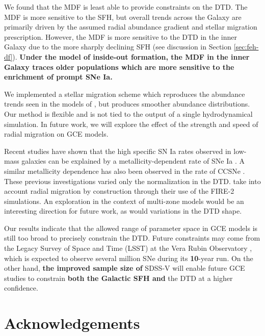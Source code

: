 \documentclass[twocolumn,twocolappendix,linenumbers]{aastex631}
\begin{document}
We found that the MDF is least able to provide constraints on the DTD. The MDF is more sensitive to the SFH, but overall trends across the Galaxy are primarily driven by the assumed radial abundance gradient and stellar migration prescription. However, the MDF is more sensitive to the DTD in the inner Galaxy due to the more sharply declining SFH (see discussion in Section \ref{sec:feh-df}). %
{\bf Under the model of inside-out formation, the MDF in the inner Galaxy traces older populations which are more sensitive to the enrichment of prompt SNe Ia.}

We implemented a stellar migration scheme which reproduces the abundance trends seen in the models of , but produces smoother abundance distributions. Our method is flexible and is not tied to the output of a single hydrodynamical simulation. In future work, we will explore the effect of the strength and speed of radial migration on GCE models.

Recent studies have shown that the high specific SN Ia rates observed in low-mass galaxies \citep[e.g.,][]{Brown2019-ASASSNrates,Wiseman2021-DESRates} can be explained by a metallicity-dependent rate of SNe Ia \citep{Gandhi2022-MetallicityDependentRates,Johnson2023-Binaries}. A similar metallicity dependence has also been observed in the rate of CCSNe \citep{Pessi2023-MetalDepCCSNe}. These previous investigations varied only the normalization in the DTD. \citet{Gandhi2022-MetallicityDependentRates} take into account radial migration by construction through their use of the FIRE-2 simulations. An exploration in the context of multi-zone models would be an interesting direction for future work, as would variations in the DTD shape.

Our results indicate that the allowed range of parameter space in GCE models is still too broad to precisely constrain the DTD. Future constraints may come from the Legacy Survey of Space and Time (LSST) at the Vera Rubin Observatory \citep{Ivezic2019-LSST}, which is expected to observe several million SNe during its {\bf 10}-year run. On the other hand, %
{\bf the improved sample size of} SDSS-V \citep{Kollmeier2017-SDSS-V} will enable future GCE studies to constrain {\bf both the Galactic SFH and} the DTD at a higher confidence.

\section*{Acknowledgements}
\end{document}
